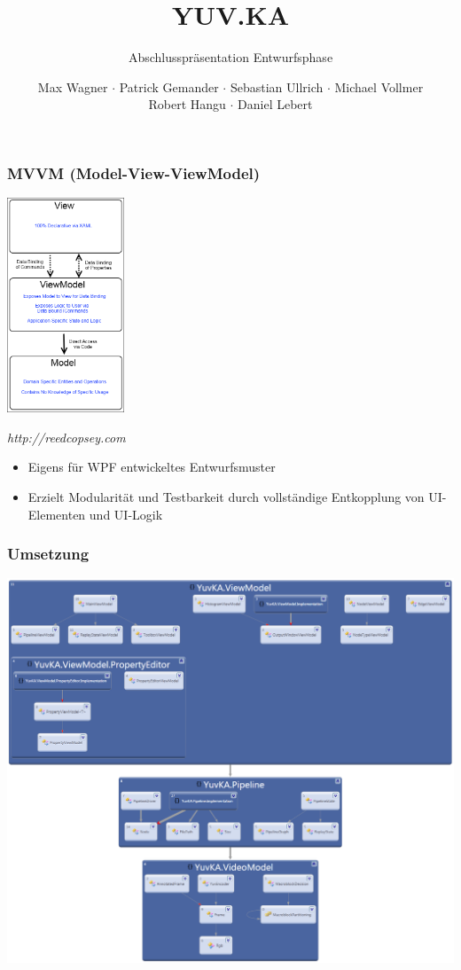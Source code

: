 \documentclass[t]{beamer}
\title{YUV.KA}
\subtitle{Abschlusspräsentation Entwurfsphase}
\author{Max Wagner $\cdot$ Patrick Gemander $\cdot$ Sebastian Ullrich $\cdot$ Michael Vollmer \\ Robert Hangu $\cdot$ Daniel Lebert}
\institute[ITEC]{Institut für Technische Informatik}
\begin{document}
\begin{frame}
\maketitle
\end{frame}
 
\begin{frame}
\frametitle{MVVM (Model-View-ViewModel)}
\noindent
\begin{minipage}{3.5cm}
    \includegraphics[width=3.5cm]{MVVM_thumb.png}

    \textit{http://reedcopsey.com}
\end{minipage}
\hfill
\begin{minipage}{8cm}
    \begin{itemize}
        \item Eigens für WPF entwickeltes Entwurfsmuster
        \item Erzielt Modularität und Testbarkeit durch vollständige Entkopplung von UI-Elementen und UI-Logik
    \end{itemize}
\end{minipage}
\end{frame}

\begin{frame}
\frametitle{Umsetzung}
\begin{center}
    \includegraphics[height=0.9\textheight]{../Diagrams/namespacedependencies.png}
\end{center}
\end{frame}
\end{document}
